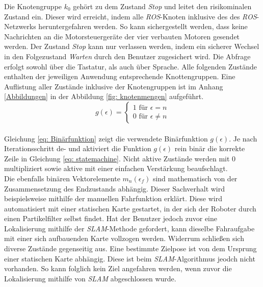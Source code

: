 		Die Knotengruppe $k_0$ gehört zu dem Zustand \textit{Stop} und leitet den risikominalen Zustand ein. Dieser wird erreicht, indem alle \textit{ROS}-Knoten inklusive des des \textit{ROS}-Netzwerks heruntergefahren werden. So kann sichergestellt werden, dass keine Nachrichten an die Motorsteuergeräte der vier verbauten Motoren gesendet werden. Der Zustand \textit{Stop} kann nur verlassen werden, indem ein sicherer Wechsel in den Folgezustand \textit{Warten} durch den Benutzer zugesichert wird. Die Abfrage erfolgt sowohl über die Tastatur, als auch über Sprache. Alle folgenden Zustände enthalten der jeweiligen Anwendung entsprechende Knottengruppen. Eine Auflistung aller Zustände inklusive der Knotengruppen ist im Anhang \ref{Abbildungen} in der Abbildung \ref{fig: knotenmengen} aufgeführt.\\ 
	
	\begin{equation}
	g(\epsilon)=\left\{\begin{array}{ll} 1 \text{ für } \epsilon=n \\
	0 \text{ für }\epsilon\neq n\end{array}\right. 
	\label{eq: Binärfunktion}
	\end{equation}\\
		
		Gleichung \ref{eq: Binärfunktion} zeigt die verwendete Binärfunktion $g(\epsilon)$. Je nach Iterationsschritt de- und aktiviert die Funktion $g(\epsilon)$ rein binär die korrekte Zeile in Gleichung \ref{eq: statemachine}. Nicht aktive Zustände werden mit 0 multipliziert sowie aktive mit einer einfachen Verstärkung beaufschlagt. \\
		
		Die ebenfalls binären Vektorelemente $m_n(\epsilon_f)$ sind mathematisch von der Zusammensetzung des Endzustands abhängig. Dieser Sachverhalt wird beispielsweise mithilfe der manuellen Fahrfunktion erklärt. Diese wird automatisiert mit einer statischen Karte gestartet, in der sich der Roboter durch einen Partikelfilter selbst findet. Hat der Benutzer jedoch zuvor eine Lokalisierung mithilfe der \textit{SLAM}-Methode gefordert, kann dieselbe Fahraufgabe mit einer sich aufbauenden Karte vollzogen werden. Widerrum schließen sich diverse Zustände gegenseitig aus. Eine bestimmte Zielpose ist von dem Ursprung einer statischen Karte abhängig. Diese ist beim \textit{SLAM}-Algorithmus jeodch nicht vorhanden. So kann folglich kein Ziel angefahren werden, wenn zuvor die Lokalisierung mithilfe von \textit{SLAM} abgeschlossen wurde.\\
		
